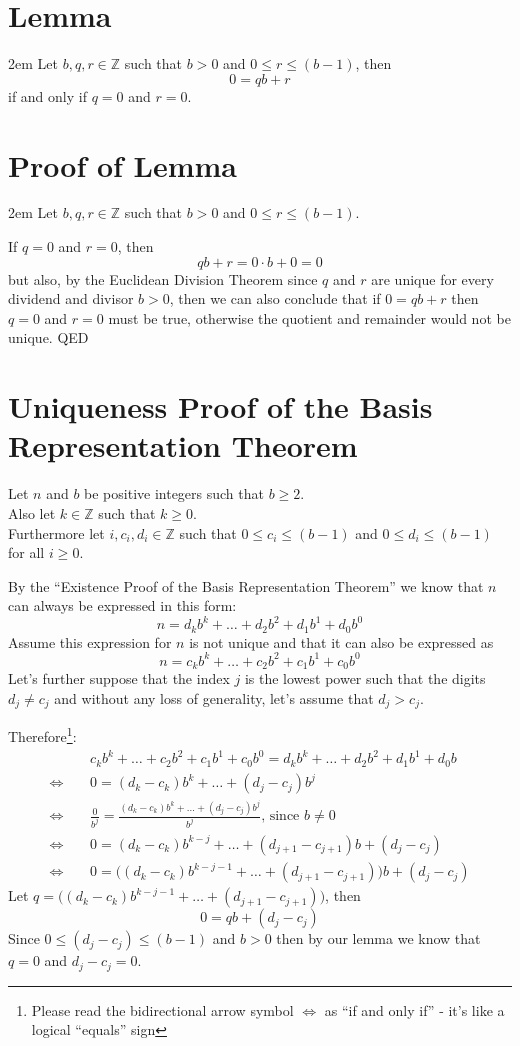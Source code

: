 \documentclass{article}
\newenvironment{jprIn}{\begin{adjustwidth}{2em}{}}{\end{adjustwidth}}
\begin{document}
\section*{Lemma}
\begin{jprIn}
Let $b, q, r \in{} \mathbb{Z}$ such that $b>0$ and $0\le{}r\le(b-1)$, then
\[0=qb+r\]
if and only if $q=0$ and $r=0$.
\end{jprIn}

\section*{Proof of Lemma}
\begin{jprIn}
Let $b, q, r \in{} \mathbb{Z}$ such that $b>0$ and $0\le{}r\le{}(b-1)$.

If $q=0$ and $r=0$, then
\[qb+r=0\cdot{}b+0=0\]
but also, by the Euclidean Division Theorem since $q$ and $r$ are unique for every dividend and divisor $b>0$,
then we can also conclude that if $0=qb+r$ then $q=0$ and $r=0$ must be true, otherwise the quotient and remainder
would not be unique. QED
\end{jprIn}

\section*{Uniqueness Proof of the Basis Representation Theorem}
Let $n$ and $b$ be positive integers such that $b\ge2$.\\
Also let $k\in\mathbb{Z}$ such that $k\ge0$.\\
Furthermore let $i, c_i, d_i\in\mathbb{Z}$ such that
$0\le{}c_i\le{}(b-1)$ and $0\le{}d_i\le{}(b-1)$ for all $i\ge0$.

By the ``Existence Proof of the Basis Representation Theorem'' we know that $n$ can
always be expressed in this form:
\[n=d_kb^k+\dots+d_2b^2+d_1b^1+d_0b^0\]
Assume this expression for $n$ is not unique and that it can also be expressed as
\[n=c_kb^k+\dots+c_2b^2+c_1b^1+c_0b^0\]
Let's further suppose that the index $j$ is the lowest power such that the digits $d_j\ne{}c_j$ and without any loss of generality,
let's assume that $d_j>c_j$.

Therefore\footnote{Please read the bidirectional arrow symbol $\Leftrightarrow$ as ``if and only if'' - it's like a logical ``equals'' sign}:
\begin{align*}
& c_kb^k+\dots+c_2b^2+c_1b^1+c_0b^0=d_kb^k+\dots+d_2b^2+d_1b^1+d_0b\\
\Leftrightarrow\;\;\;\;&0=(d_k-c_k)b^k+\dots+(d_j-c_j)b^j\\
\Leftrightarrow\;\;\;\;& \frac{0}{b^j}=\frac{(d_k-c_k)b^k+\dots+(d_j-c_j)b^j}{b^j}\text{, since }b\ne0\\
\Leftrightarrow\;\;\;\;& 0=(d_k-c_k)b^{k-j}+\dots+(d_{j+1}-c_{j+1})b+(d_j-c_j)\\
\Leftrightarrow\;\;\;\;& 0=\big((d_k-c_k)b^{k-j-1}+\dots+(d_{j+1}-c_{j+1})\big)b+(d_j-c_j)
\end{align*}
Let $q=\big((d_k-c_k)b^{k-j-1}+\dots+(d_{j+1}-c_{j+1})\big)$, then
\[0=qb+(d_j-c_j)\]
Since $0\le(d_j-c_j)\le(b-1)$ and $b>0$ then by our lemma we know that\\
$q=0$ and $d_j-c_j = 0$.
\end{document}
